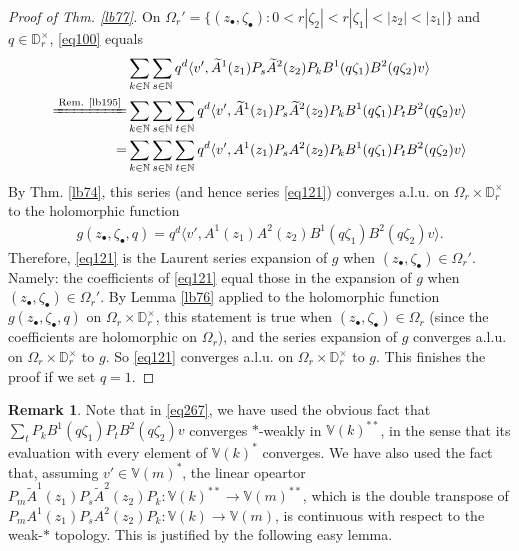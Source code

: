 \documentclass[11pt,b5paper,notitlepage]{article}
\theoremstyle{definition}
\newtheorem{rem}[df]{Remark}
\theoremstyle{plain}
\newcommand{\wtd}{\widetilde}
\newcommand{\bk}[1]{\langle {#1}\rangle}
\newcommand{\blt}{\bullet}
\newcommand{\Vbb}{\mathbb V}
\newcommand{\Nbb}{\mathbb N}
\newcommand{\Dbb}{\mathbb D}
\numberwithin{equation}{section}
\begin{document}
\begin{proof}[Proof of Thm. \ref{lb77}]
On $\Omega_r'=\{(z_\blt,\zeta_\blt):0<r|\zeta_2|<r|\zeta_1|<|z_2|<|z_1|\}$ and $q\in\Dbb_r^\times$, \eqref{eq100} equals
\begin{align}\label{eq267}
\begin{aligned}
&\sum_{k\in\Nbb}\sum_{s\in\Nbb}q^d\bk{v',\wtd A^1(z_1)P_s\wtd A^2(z_2)P_kB^1(q\zeta_1)B^2(q\zeta_2)v}\\
\xlongequal{\text{Rem. \ref{lb195}}}&\sum_{k\in\Nbb}\sum_{s\in\Nbb}\sum_{t\in\Nbb}q^d\bk{v',\wtd A^1(z_1)P_s\wtd A^2(z_2)P_kB^1(q\zeta_1)P_tB^2(q\zeta_2)v}\\
=&\sum_{k\in\Nbb}\sum_{s\in\Nbb}\sum_{t\in\Nbb}q^d\bk{v',A^1(z_1)P_s A^2(z_2)P_kB^1(q\zeta_1)P_tB^2(q\zeta_2)v}
\end{aligned}
\end{align}
By Thm. \ref{lb74}, this series (and hence series \eqref{eq121}) converges a.l.u. on $\Omega_r\times\Dbb_r^\times$ to the holomorphic function
\begin{align*}
g(z_\blt,\zeta_\blt,q)=q^d	\bk{v', A^1(z_1) A^2(z_2)B^1(q\zeta_1)B^2(q\zeta_2)v}.
\end{align*}
Therefore, \eqref{eq121} is the Laurent series expansion of $g$ when $(z_\blt,\zeta_\blt)\in\Omega_r'$. Namely: the coefficients of \eqref{eq121} equal those in the expansion of $g$ when $(z_\blt,\zeta_\blt)\in\Omega_r'$. By Lemma \ref{lb76} applied to the holomorphic function $g(z_\blt,\zeta_\blt,q)$ on $\Omega_r\times\Dbb_r^\times$, this statement is true when $(z_\blt,\zeta_\blt)\in\Omega_r$ (since the coefficients are holomorphic on $\Omega_r$), and the series expansion of $g$  converges a.l.u. on $\Omega_r\times\Dbb_r^\times$ to $g$. So \eqref{eq121} converges a.l.u. on $\Omega_r\times\Dbb_r^\times$ to $g$. This finishes the proof if we set $q=1$.
\end{proof}

\begin{rem}\label{lb195}
Note that in \eqref{eq267}, we have used the obvious fact that $\sum_t P_kB^1(q\zeta_1)P_t B^2(q\zeta_2)v$ converges $*$-weakly in $\Vbb(k)^{**}$, in the sense that its evaluation with every element of $\Vbb(k)^*$ converges. We have also used the fact that, assuming $v'\in\Vbb(m)^*$, the linear opeartor $P_m\wtd A^1(z_1)P_s\wtd A^2(z_2)P_k:\Vbb(k)^{**}\rightarrow \Vbb(m)^{**}$, which is the double transpose of $P_m A^1(z_1)P_s A^2(z_2)P_k:\Vbb(k)\rightarrow \Vbb(m)$, is continuous with respect to the weak-$*$ topology. This is justified by the following easy lemma.  
\end{rem}
\end{document}
